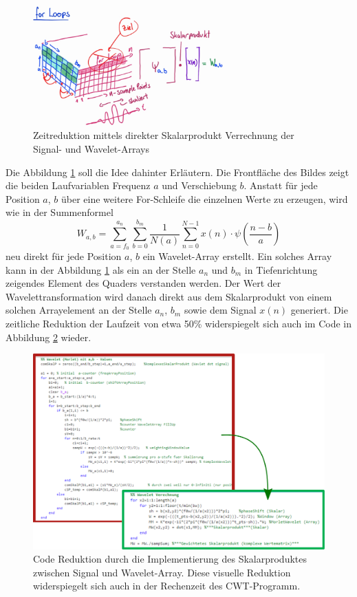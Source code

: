 \begin{figure}
	\centering
	\includegraphics[width=0.65\textwidth]{papers/wavelets/images/14-1_EliminationForLoops.png}
	\caption{Zeitreduktion mittels direkter Skalarprodukt
	Verrechnung der Signal- und Wavelet-Arrays}
	\label{wavelet:fig:EliminationForLoops}
\end{figure}

Die Abbildung \ref{wavelet:fig:EliminationForLoops} soll die Idee
dahinter Erläutern.
Die Frontfläche des Bildes zeigt die beiden Laufvariablen Frequenz
$a$ und Verschiebung $b$.
Anstatt für jede Position $a$, $b$ über eine weitere For-Schleife
die einzelnen Werte zu erzeugen, wird wie in der Summenformel
\[
W_{a,b}
=
\sum_{a=f_0}^{a_n}\sum_{b=0}^{b_m}\frac{1}{N(a)}\sum_{n=0}^{N-1}
x(n)\cdot\psi\left(\frac{n-b}{a}\right)
\]
neu direkt für jede Position $a$, $b$ ein Wavelet-Array erstellt.
Ein solches Array kann in der Abbildung
\ref{wavelet:fig:EliminationForLoops} als ein an der Stelle $a_n$
und $b_m$ in Tiefenrichtung zeigendes Element des Quaders verstanden
werden.
Der Wert der Wavelettransformation wird danach direkt aus dem
Skalarprodukt von einem solchen Arrayelement an der Stelle $a_n$,
$b_m$ sowie dem Signal $x(n)$ generiert.
Die zeitliche Reduktion der Laufzeit von etwa 50\% widerspiegelt
sich auch im Code in Abbildung \ref{wavelet:fig:EliminationForLoopCode}
wieder.

\begin{figure}
	\centering
	\includegraphics[width=\textwidth]{papers/wavelets/images/14-2_CodeSkalarProd.png}
	\caption{Code Reduktion durch die Implementierung des
	Skalarproduktes zwischen Signal und Wavelet-Array.
	Diese visuelle Reduktion widerspiegelt sich auch in der
	Rechenzeit des CWT-Programm.}
	\label{wavelet:fig:EliminationForLoopCode}
\end{figure}

